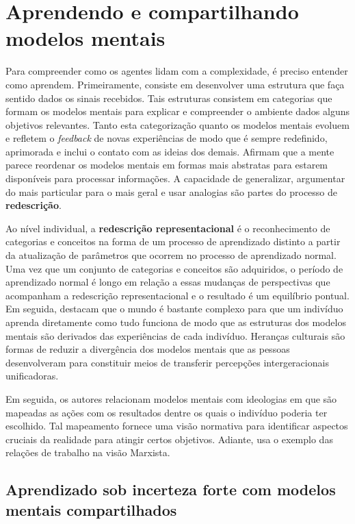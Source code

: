 \documentclass[11pt,lineno]{../style}
\begin{document}
\section{Aprendendo e compartilhando modelos mentais}

Para compreender como os agentes lidam com a complexidade, é preciso entender como aprendem. Primeiramente, consiste em desenvolver uma estrutura que faça sentido dados os sinais recebidos. Tais estruturas consistem em categorias que formam os modelos mentais para explicar e compreender o ambiente dados alguns objetivos relevantes. Tanto esta categorização quanto os modelos mentais evoluem  e refletem o \textit{feedback} de novas experiências de modo que é sempre redefinido, aprimorada e inclui o contato com as ideias dos demais. Afirmam que a mente parece reordenar os modelos mentais em formas mais abstratas para estarem disponíveis para processar informações. A capacidade de generalizar, argumentar do mais particular para o mais geral e usar analogias são partes do processo de \textbf{redescrição}.

Ao nível individual, a \textbf{redescrição representacional} é o reconhecimento de categorias e conceitos na forma de um processo de aprendizado distinto a partir da atualização de parâmetros que ocorrem no processo de aprendizado normal. Uma vez que um conjunto de categorias e conceitos são adquiridos, o período de aprendizado normal é longo em relação a essas mudanças de perspectivas que acompanham a redescrição representacional e o resultado é um equilíbrio pontual.
Em seguida, destacam que o mundo é bastante complexo para que um indivíduo aprenda diretamente como tudo funciona de modo que as estruturas dos modelos mentais são derivados das experiências de cada indivíduo. Heranças culturais são formas de reduzir a divergência dos modelos mentais que as pessoas desenvolveram para constituir meios de transferir percepções intergeracionais unificadoras. 

Em seguida, os autores relacionam modelos mentais com ideologias em que são mapeadas as ações com os resultados dentre os quais o indivíduo poderia ter escolhido. Tal mapeamento fornece uma visão normativa para identificar aspectos cruciais da realidade para atingir certos objetivos. Adiante, usa o exemplo das relações de trabalho na visão Marxista.

\subsection{Aprendizado sob incerteza forte com modelos mentais compartilhados}
\end{document}
